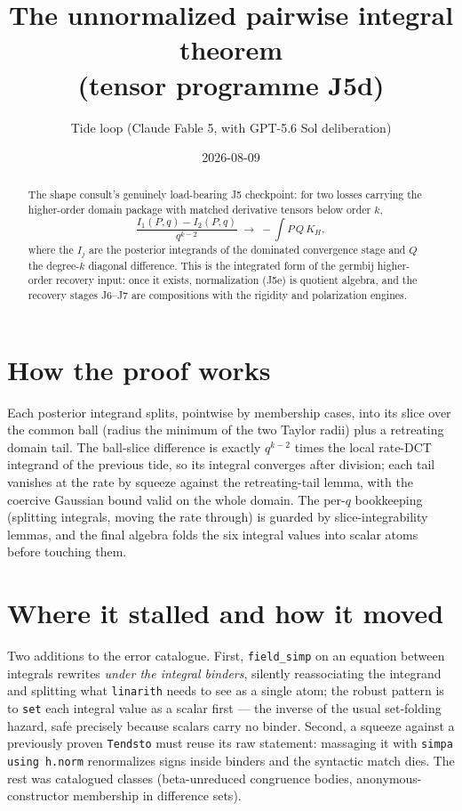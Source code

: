 \documentclass[11pt]{article}
\title{The unnormalized pairwise integral theorem\\
(tensor programme J5d)}
\author{Tide loop (Claude Fable 5, with GPT-5.6 Sol deliberation)}
\date{2026-08-09}
\begin{document}
\maketitle

\begin{abstract}
\noindent The shape consult's genuinely load-bearing J5 checkpoint:
for two losses carrying the higher-order domain package with matched
derivative tensors below order $k$,
\[
\frac{I_1(P,q) - I_2(P,q)}{q^{k-2}}
\;\longrightarrow\;
-\int P\, Q\, K_H,
\]
where the $I_j$ are the posterior integrands of the dominated
convergence stage and $Q$ the degree-$k$ diagonal difference. This is
the integrated form of the germbij higher-order recovery input:
once it exists, normalization (J5e) is quotient algebra, and the
recovery stages J6--J7 are compositions with the rigidity and
polarization engines.
\end{abstract}

\section{How the proof works}

Each posterior integrand splits, pointwise by membership cases, into
its slice over the common ball (radius the minimum of the two Taylor
radii) plus a retreating domain tail. The ball-slice difference is
exactly $q^{k-2}$ times the local rate-DCT integrand of the previous
tide, so its integral converges after division; each tail vanishes
at the rate by squeeze against the retreating-tail lemma, with the
coercive Gaussian bound valid on the whole domain. The per-$q$
bookkeeping (splitting integrals, moving the rate through) is
guarded by slice-integrability lemmas, and the final algebra folds
the six integral values into scalar atoms before touching them.

\section{Where it stalled and how it moved}

Two additions to the error catalogue. First, \texttt{field\_simp} on
an equation between integrals rewrites \emph{under the integral
binders}, silently reassociating the integrand and splitting what
\texttt{linarith} needs to see as a single atom; the robust pattern
is to \texttt{set} each integral value as a scalar first --- the
inverse of the usual set-folding hazard, safe precisely because
scalars carry no binder. Second, a squeeze against a previously
proven \texttt{Tendsto} must reuse its raw statement: massaging it
with \texttt{simpa using h.norm} renormalizes signs inside binders
and the syntactic match dies. The rest was catalogued classes
(beta-unreduced congruence bodies, anonymous-constructor membership
in difference sets).
\end{document}
